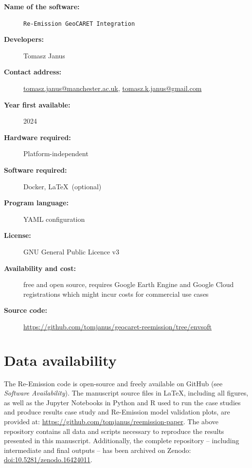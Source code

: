 \documentclass[review, authoryear, 1p]{elsarticle} %
\begin{document}
\vspace{3pt}

\begin{description}
  \item[\textbf{Name of the software:}] \texttt{Re-Emission GeoCARET Integration}
  \item[\textbf{Developers:}] Tomasz Janus
  \item[\textbf{Contact address:}] \href{mailto:tomasz.janus@manchester.ac.uk}{tomasz.janus@manchester.ac.uk}, \href{mailto:tomasz.k.janus@gmail.com}{tomasz.k.janus@gmail.com}
  \item[\textbf{Year first available:}] 2024
  \item[\textbf{Hardware required:}] Platform-independent
  \item[\textbf{Software required:}] Docker, \LaTeX \, (optional)
  \item[\textbf{Program language:}] YAML configuration
  \item[\textbf{License:}] GNU General Public Licence v3
  \item[\textbf{Availability and cost:}] free and open source, requires Google Earth Engine and Google Cloud registrations which might incur costs for commercial use cases
  \item[\textbf{Source code:}] \href{https://github.com/tomjanus/geocaret-reemission/tree/envsoft}{https://github.com/tomjanus/geocaret-reemission/tree/envsoft}
\end{description}

\section{Data availability}
\label{sec:data_availability}

The Re-Emission code is open-source and freely available on GitHub (see \emph{Software Availability}).
The manuscript source files in \LaTeX, including all figures, as well as the Jupyter Notebooks in Python and R used to run the case studies and produce results case study and Re-Emission model validation plots, are provided at: \href{https://github.com/tomjanus/reemission-paper}{https://github.com/tomjanus/reemission-paper}.
The above repository contains all data and scripts necessary to reproduce the results presented in this manuscript. 
Additionally, the complete repository -- including intermediate and final outputs -- has been archived on Zenodo: \href{https://doi.org/10.5281/zenodo.16424011}{doi:10.5281/zenodo.16424011}.
\end{document}
